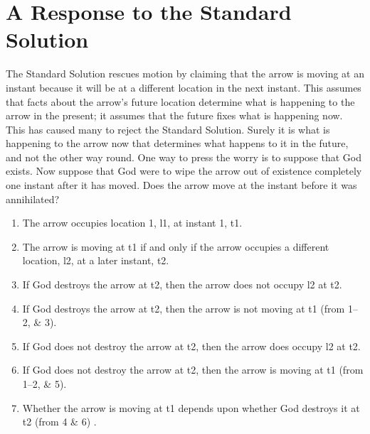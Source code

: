 \documentclass[oneside]{article}
\begin{document}
\section*{A Response to the Standard Solution}

The Standard Solution rescues motion by claiming that the arrow is moving at an instant because it will be at a different location in the next instant. This assumes that facts about the arrow's future location determine what is happening to the arrow in the present; it assumes that the future fixes what is happening now. This has caused many to reject the Standard Solution. Surely it is what is happening to the arrow now that determines what happens to it in the future, and not the other way round.  One way to press the worry is to suppose that God exists. Now suppose that God were to wipe the arrow out of existence completely one instant after it has moved. Does the arrow move at the instant before it was annihilated?  

\begin{enumerate}
\item The arrow occupies location 1, l1, at instant 1, t1.
\item The arrow is moving at t1 if and only if the arrow occupies a different location, l2, at a later instant, t2. 
\item If God destroys the arrow at t2, then the arrow does not occupy l2 at t2.
\item If God destroys the arrow at t2, then the arrow is not moving at t1 (from 1--2, \& 3).
\item If God does not destroy the arrow at t2, then the arrow does occupy l2 at t2. 
\item If God does not destroy the arrow at t2, then the arrow is moving at t1 (from 1--2, \& 5).
\item Whether the arrow is moving at t1 depends upon whether God destroys it at t2 (from 4 \& 6) .
\end{enumerate}
\end{document}
